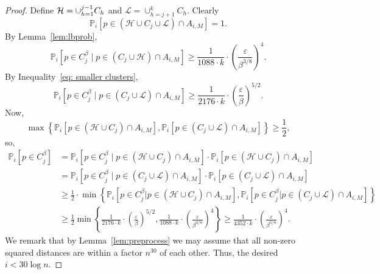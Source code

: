 \documentclass[11pt]{article}
\begin{document}
\begin{proof}
Define ${\cal H} = \cup_{h=1}^{j-1} C_h$ and $\mathcal{L} = \cup_{h=j+1}^k C_h$.
Clearly 
$$\mathbb{P}_i[p\in (\mathcal{H}\cup C_j\cup \mathcal{L})\cap A_{i,M}] = 1.$$
By Lemma~\ref{lem:lbprob}, 
$$
\mathbb{P}_i[p\in C_j^\beta\mid p\in (C_j\cup\mathcal{H})\cap A_{i,M}] \geq \frac{1}{1088\cdot k}\cdot
 \left(\frac{\varepsilon}{\beta^{3/8}}\right)^4.
$$
By Inequality~\eqref{eq: smaller clusters},
$$\mathbb{P}_i[p\in C_j^\beta\mid p\in (C_j\cup\mathcal{L})\cap A_{i,M}] \geq \frac{1}{2176 \cdot k} \cdot \left(\frac{\varepsilon}{\beta}\right)^{5/2}.$$
Now,
$$\max\left\{\mathbb{P}_i[p\in (\mathcal{H}\cup C_j)\cap A_{i,M}], 
\mathbb{P}_i[p\in (C_j\cup\mathcal{L})\cap A_{i,M}]\right\}\geq \frac 1 2,$$ 
so, 
\begin{align*}
 \mathbb{P}_i[p\in C_j^\beta] &= \mathbb{P}_i[p\in C_j^\beta \mid p\in (\mathcal{H}\cup C_j)\cap A_{i,M}]\cdot \mathbb{P}_i[p\in (\mathcal{H}\cup C_j)\cap A_{i,M}] \\  
 &= \mathbb{P}_i[p\in C_j^\beta \mid p\in (C_j\cup\mathcal{L})\cap A_{i,M}]\cdot 
  \mathbb{P}_i[p\in (C_j\cup\mathcal{L})\cap A_{i,M}] \\
 &\geq \frac 1 2 \cdot \min\left\{\mathbb{P}_i[p\in C_j^\beta | p\in (\mathcal{H}\cup C_j)\cap A_{i,M}], \mathbb{P}_i[p\in C_j^\beta | p\in (C_j\cup\mathcal{L})\cap A_{i,M}]\right\} \\
 &\geq \frac{1}{2}\min\left\{\frac{1}{2176 \cdot k} \cdot \left(\frac{\varepsilon}{\beta}\right)^{5/2},
 \frac{1}{1088\cdot k}\cdot
 \left(\frac{\varepsilon}{\beta^{3/8}}\right)^4\right\} \geq \frac{1}{4352\cdot k}\cdot \left(\frac{\varepsilon}{\beta^{5/8}}\right)^4.
\end{align*}
We remark that by Lemma~\ref{lem:preprocess} we may assume that all non-zero squared distances are within a factor $n^{30}$ of each other. Thus, the desired $i < 30\log n$.
\end{proof}
\end{document}
